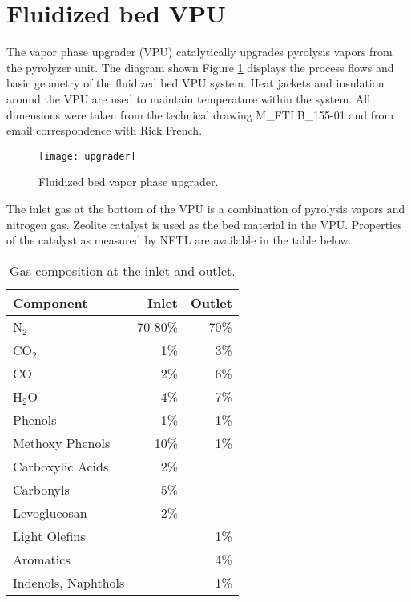 
\section{Fluidized bed VPU}

The vapor phase upgrader (VPU) catalytically upgrades pyrolysis vapors from the pyrolyzer unit. The diagram shown Figure \ref{fig:upgrader} displays the process flows and basic geometry of the fluidized bed VPU system. Heat jackets and insulation around the VPU are used to maintain temperature within the system. All dimensions were taken from the technical drawing M\_FTLB\_155-01 and from email correspondence with Rick French.

\begin{figure}[H]
    \centering
    \texttt{[image: upgrader]}
    \caption{Fluidized bed vapor phase upgrader.}
    \label{fig:upgrader}
\end{figure}

The inlet gas at the bottom of the VPU is a combination of pyrolysis vapors and nitrogen gas. Zeolite catalyst is used as the bed material in the VPU. Properties of the catalyst as measured by NETL are available in the table below.

\begin{table}[H]
    \centering
    \caption{Gas composition at the inlet and outlet.}
    \label{tab:gas-comp}
    \begin{tabular}{lrr}
        \toprule
        Component & Inlet & Outlet \\
        \midrule
        N$_2$               & 70-80\%   & 70\%  \\
        CO$_2$              & 1\%       & 3\%   \\
        CO                  & 2\%       & 6\%   \\
        H$_2$O              & 4\%       & 7\%   \\
        Phenols             & 1\%       & 1\%   \\
        Methoxy Phenols     & 10\%      & 1\%   \\
        Carboxylic Acids    & 2\%       &       \\
        Carbonyls           & 5\%       &       \\
        Levoglucosan        & 2\%       &       \\
        Light Olefins       &           & 1\%   \\
        Aromatics           &           & 4\%   \\
        Indenols, Naphthols &           & 1\%   \\
        \bottomrule
    \end{tabular}
\end{table}

